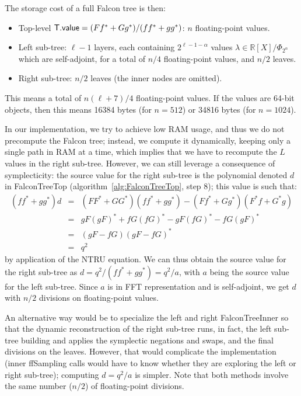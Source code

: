 \documentclass{llncs}
\newcommand{\bR}{\mathbb{R}}
\newcommand{\adj}[1]{{#1}^*}
\begin{document}
The storage cost of a full Falcon tree is then:
\begin{itemize}

    \item Top-level
    $\text{\textsf{T.value}} = (F\adj{f} + G\adj{g})/(f\adj{f} + g\adj{g})$:
    $n$ floating-point values.

    \item Left sub-tree: $\ell - 1$ layers, each containing
    $2^{\ell - 1 - \alpha}$ values $\lambda \in\bR[X]/\Phi_{2^\alpha}$
    which are self-adjoint, for a total of $n/4$ floating-point values,
    and $n/2$ leaves.

    \item Right sub-tree: $n/2$ leaves (the inner nodes are omitted).
\end{itemize}
This means a total of $n(\ell + 7)/4$ floating-point values. If the
values are 64-bit objects, then this means 16384 bytes (for $n = 512$)
or 34816 bytes (for $n = 1024$).

In our implementation, we try to achieve low RAM usage, and thus we do
not precompute the Falcon tree; instead, we compute it dynamically,
keeping only a single path in RAM at a time, which implies that we have
to recompute the $L$ values in the right sub-tree. However, we can still
leverage a consequence of symplecticity: the source value for the right
sub-tree is the polynomial denoted $d$ in \textsf{FalconTreeTop}
(algorithm~\ref{alg:FalconTreeTop}, step 8); this value is such that:
\begin{eqnarray*}
    (f\adj{f} + g\adj{g}) d
      &=& (F\adj{F} + G\adj{G})(f\adj{f} + g\adj{g})
        - (F\adj{f} + G\adj{g})(\adj{F}f + \adj{G}{g}) \\
      &=& gF\adj{(gF)} + fG\adj{(fG)} - gF\adj{(fG)} - fG\adj{(gF)} \\
      &=& (gF - fG)\adj{(gF - fG)} \\
      &=& q^2
\end{eqnarray*}
by application of the NTRU equation. We can thus obtain the source
value for the right sub-tree as $d = q^2/(f\adj{f} + g\adj{g}) = q^2/a$,
with $a$ being the source value for the left sub-tree. Since $a$ is
in FFT representation and is self-adjoint, we get $d$ with $n/2$
divisions on floating-point values.

An alternative way would be to specialize the left and right
\textsf{FalconTreeInner} so that the dynamic reconstruction of the right
sub-tree runs, in fact, the left sub-tree building and applies the
symplectic negations and swaps, and the final divisions on the leaves.
However, that would complicate the implementation (inner
\textsf{ffSampling} calls would have to know whether they are exploring
the left or right sub-tree); computing $d = q^2/a$ is simpler. Note that
both methods involve the same number ($n/2$) of floating-point
divisions.
\end{document}
